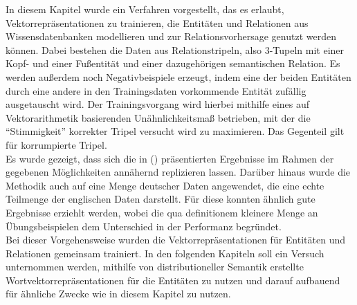 In diesem Kapitel wurde ein Verfahren vorgestellt, das es erlaubt, Vektorrepräsentationen zu trainieren, die Entitäten und Relationen
aus Wissensdatenbanken modellieren und zur Relationsvorhersage genutzt werden können. Dabei bestehen die Daten aus Relationstripeln,
also 3-Tupeln mit einer Kopf- und einer Fußentität und einer dazugehörigen semantischen Relation. Es werden außerdem noch
Negativbeispiele erzeugt, indem eine der beiden Entitäten durch eine andere in den Trainingsdaten vorkommende Entität zufällig ausgetauscht wird.
Der Trainingsvorgang wird hierbei mithilfe eines auf Vektorarithmetik basierenden Unähnlichkeitsmaß betrieben, mit der
die ``Stimmigkeit'' korrekter Tripel versucht wird zu maximieren. Das Gegenteil gilt für korrumpierte Tripel.\\
Es wurde gezeigt, dass sich die in (\cite{bordes2011learning}) präsentierten Ergebnisse im Rahmen der gegebenen Möglichkeiten
annähernd replizieren lassen. Darüber hinaus wurde die Methodik auch auf eine Menge deutscher Daten angewendet, die eine
echte Teilmenge der englischen Daten darstellt. Für diese konnten ähnlich gute Ergebnisse erziehlt werden, wobei die qua
definitionem kleinere Menge an Übungsbeispielen dem Unterschied in der Performanz begründet.\\

Bei dieser Vorgehensweise wurden die Vektorrepräsentationen für Entitäten und Relationen gemeinsam trainiert. In den folgenden
Kapiteln soll ein Versuch unternommen werden, mithilfe von distributioneller Semantik erstellte Wortvektorrepräsentationen
für die Entitäten zu nutzen und darauf aufbauend für ähnliche Zwecke wie in diesem Kapitel zu nutzen.

